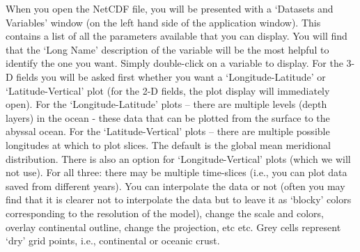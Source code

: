 \documentclass[11pt,fleqn]{book} %
\begin{document}
\noindent When you open the NetCDF file, you will be presented with a ‘\textsf{Datasets and Variables}’ window (on the left hand side of the application window). This contains a list of all the parameters available that you can display. You will find that the ‘\textsf{Long Name}’ description of the variable will be the most helpful to identify the one you want. Simply double-click on a variable to display. For the 3-D fields you will be asked first whether you want a ‘\textsf{Longitude-Latitude}’ or ‘\textsf{Latitude-Vertical}’ plot (for the 2-D fields, the plot display will immediately open).
For the ‘\textsf{Longitude-Latitude}’ plots – there are multiple levels (depth layers) in the ocean - these data that can be plotted from the surface to the abyssal ocean.
For the ‘\textsf{Latitude-Vertical}' plots – there are multiple possible longitudes at which to plot slices. The default is the global mean meridional distribution.
There is also an option for ‘\textsf{Longitude-Vertical}' plots (which we will not use).
For all three: there may be multiple time-slices (i.e., you can plot data saved from different years).
You can interpolate the data or not (often you may find that it is clearer not to interpolate the data but to leave it as ‘blocky’ colors corresponding to the resolution of the model), change the scale and colors, overlay continental outline, change the projection, etc etc. Grey cells represent ‘dry’ grid points, i.e., continental or oceanic crust.
\end{document}
